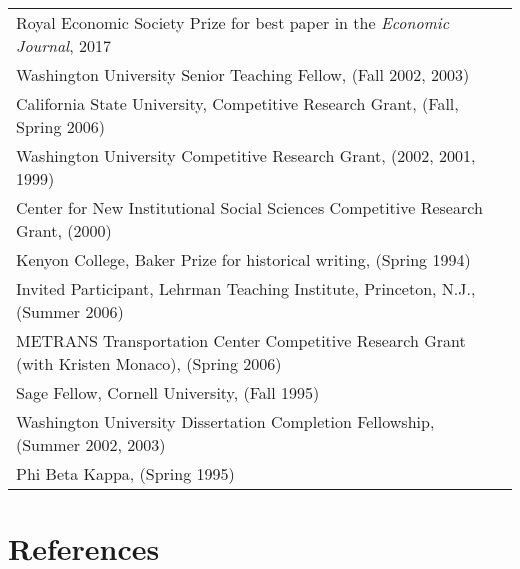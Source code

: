 \documentclass[11pt,fullpage]{article}
\begin{document}
\begin{tabular}{ll}
	Royal Economic Society Prize for best paper in the \textit{Economic Journal}, 2017 \\
	Washington University Senior Teaching Fellow, (Fall 2002, 2003) \\
	California State University, Competitive Research Grant, (Fall, Spring 2006) \\
	Washington University Competitive Research Grant, (2002, 2001, 1999) \\
	Center for New Institutional Social Sciences Competitive Research Grant, (2000) \\
	Kenyon College, Baker Prize for historical writing, (Spring 1994) \\
	Invited Participant, Lehrman Teaching Institute, Princeton, N.J., (Summer 2006) \\
	METRANS Transportation Center Competitive Research Grant (with Kristen Monaco), (Spring 2006) \\
	Sage Fellow, Cornell University, (Fall 1995) \\
	Washington University Dissertation Completion Fellowship, (Summer 2002, 2003) \\
	Phi Beta Kappa, (Spring 1995)	\\
\end{tabular}	


\vspace{.25cm}


\section*{References}
\end{document}
